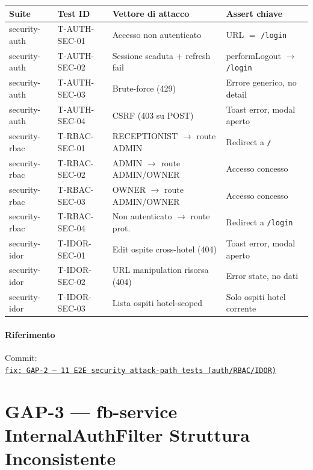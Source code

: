 ﻿\documentclass[a4paper,12pt]{report}
\newcommand{\commitref}[2]{\texttt{\small \href{https://github.com/diegoandruccioli/hotel-pms/commit/#1}{#2}}}
\begin{document}
\begin{center}
\small
\begin{tabularx}{\textwidth}{l l X l}
\toprule
\textbf{Suite} & \textbf{Test ID} & \textbf{Vettore di attacco} & \textbf{Assert chiave} \\
\midrule
security-auth  & T-AUTH-SEC-01 & Accesso non autenticato          & URL $=$ \texttt{/login} \\
security-auth  & T-AUTH-SEC-02 & Sessione scaduta + refresh fail  & performLogout $\to$ \texttt{/login} \\
security-auth  & T-AUTH-SEC-03 & Brute-force (429)                & Errore generico, no detail \\
security-auth  & T-AUTH-SEC-04 & CSRF (403 su POST)               & Toast error, modal aperto \\
security-rbac  & T-RBAC-SEC-01 & RECEPTIONIST $\to$ route ADMIN   & Redirect a \texttt{/} \\
security-rbac  & T-RBAC-SEC-02 & ADMIN $\to$ route ADMIN/OWNER    & Accesso concesso \\
security-rbac  & T-RBAC-SEC-03 & OWNER $\to$ route ADMIN/OWNER    & Accesso concesso \\
security-rbac  & T-RBAC-SEC-04 & Non autenticato $\to$ route prot.& Redirect a \texttt{/login} \\
security-idor  & T-IDOR-SEC-01 & Edit ospite cross-hotel (404)    & Toast error, modal aperto \\
security-idor  & T-IDOR-SEC-02 & URL manipulation risorsa (404)   & Error state, no dati \\
security-idor  & T-IDOR-SEC-03 & Lista ospiti hotel-scoped        & Solo ospiti hotel corrente \\
\bottomrule
\end{tabularx}
\end{center}

\paragraph{Riferimento} Commit:\\
\commitref{f2cbc7d}{fix: GAP-2 — 11 E2E security attack-path tests (auth/RBAC/IDOR)}

\section{GAP-3 --- fb-service InternalAuthFilter Struttura Inconsistente}
\end{document}
